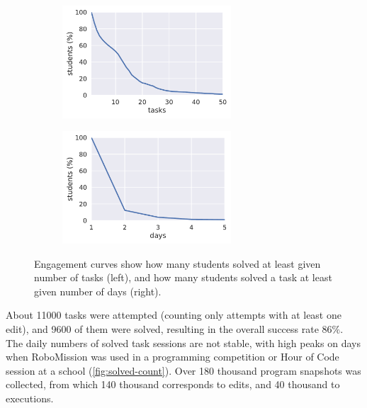 \begin{figure}[htb]
\centering
\begin{subfigure}{.49\textwidth}
\centering
\includegraphics[height=42mm]{img/engagement-tasks}
\end{subfigure}
\begin{subfigure}{.49\textwidth}
\centering
\includegraphics[height=42mm]{img/engagement-days}
\end{subfigure}
\caption{%
  Engagement curves show how many students solved at least given number of tasks (left),
  and how many students solved a task at least given number of days (right).}
\label{fig:engagement-curves}
\end{figure}


About 11000 tasks were attempted (counting only attempts with at least one edit),
and 9600 of them were solved,
resulting in the overall success rate $86\%$.
The daily numbers of solved task sessions are not stable,
with high peaks on days when RoboMission was used
in a programming competition or Hour of Code session at a school
(\cref{fig:solved-count}).
Over 180 thousand program snapshots was collected,
from which 140 thousand corresponds to edits,
and 40 thousand to executions.

